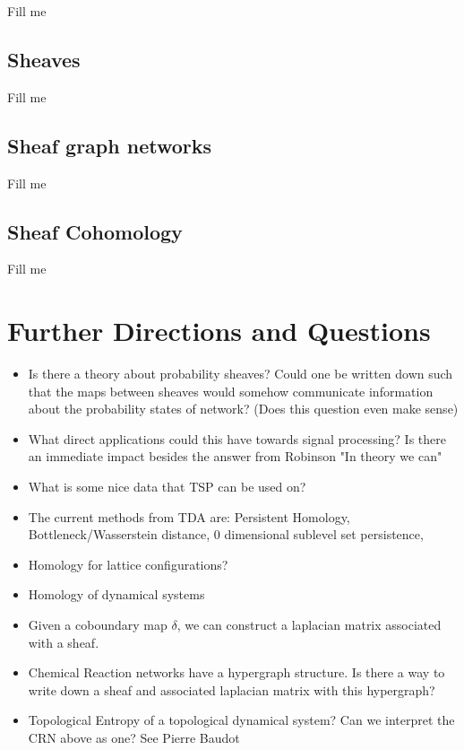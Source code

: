 \documentclass[12pt]{article}
\theoremstyle{plain}
\theoremstyle{definition}
\begin{document}
Fill me


\subsection{Sheaves}

Fill me 

\subsection{Sheaf graph networks}

Fill me 

\subsection{Sheaf Cohomology}

Fill me

\section{Further Directions and Questions}

\begin{itemize}
  \item Is there a theory about probability sheaves? Could one be written down such that
    the maps between sheaves would somehow communicate information about the probability 
    states of network? (Does this question even make sense)

  \item What direct applications could this have towards signal processing? Is there an immediate
    impact besides the answer from Robinson "In theory we can"

  \item What is some nice data that TSP can be used on?

  \item The current methods from TDA are: Persistent Homology, Bottleneck/Wasserstein distance, 
    0 dimensional sublevel set persistence, 

  \item Homology for lattice configurations?

  \item Homology of dynamical systems

  \item Given a coboundary map $\delta$, we can construct a laplacian matrix associated with a sheaf.

  \item Chemical Reaction networks have a hypergraph structure. Is there a way to write down a sheaf and associated
    laplacian matrix with this hypergraph?

  \item Topological Entropy of a topological dynamical system? Can we interpret the CRN above as one? See Pierre Baudot

\end{itemize}
\end{document}
